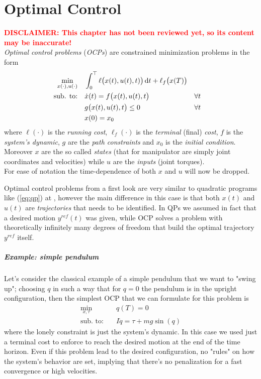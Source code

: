 \chapter{Optimal Control}

\textcolor{red}{\textbf{{\Large DISCLAIMER: This chapter has not been reviewed yet, so its content may be inaccurate!}}}
\\

	\textit{Optimal control problems} (\textit{OCPs}) are constrained minimization problems in the form
	\begin{equation} \label{eq:ocpstatement}
	\begin{aligned}
		\min_{x(\cdot), u(\cdot)} \quad & \int_0^\top  \ell\big(x(t), u(t), t)\big) \, \mathrm{d} t + \ell_f\big(x(T)\big) \\
		\textrm{sub. to:} \quad & \dot x(t) = f\big(x(t), u(t), t\big) && \forall t \\
		& g\big(x(t), u(t), t\big) \leq 0 && \forall t \\
		& x(0) = x_0 
	\end{aligned}
	\end{equation}
	where $\ell(\cdot)$ is the \textit{running cost}, $\ell_f(\cdot)$ is the \textit{terminal} (final) \textit{cost}, $f$ is the \textit{system's dynamic}, $g$ are the \textit{path constraints} and $x_0$ is the \textit{initial condition}. Moreover $x$ are the so called \textit{states} (that for manipulator are simply joint coordinates and velocities) while $u$ are the \textit{inputs} (joint torques). \\
	For ease of notation the time-dependence of both $x$ and $u$ will now be dropped.
	
	Optimal control problems from a first look are very similar to quadratic programs like (\ref{eq:qp}) at \pageref{eq:qp}, however the main difference in this case is that both $x(t)$ and $u(t)$ are \textit{trajectories} that needs to be identified. In QPs we assumed in fact that a desired motion $y^{ref} (t)$ was given, while OCP solves a problem with theoretically infinitely many degrees of freedom that build the optimal trajectory $y^{ref}$ itself.
	
	\paragraph{Example: simple pendulum} Let's consider the classical example of a simple pendulum that we want to "swing up"; choosing $q$ in such a way that for $q=0$ the pendulum is in the upright configuration, then the simplest OCP that we can formulate for this problem is
	\begin{align*}
		\min_{x,\tau} \quad & q(T) = 0 \\
		\textrm{sub. to:} \quad & I\ddot q = \tau + mg\sin(q)
	\end{align*}
	where the lonely constraint is just the system's dynamic. In this case we used just a terminal cost to enforce to reach the desired motion at the end of the time horizon. Even if this problem lead to the desired configuration, no "rules" on how the system's behavior are set, implying that there's no penalization for a fast convergence or high velocities.
	
